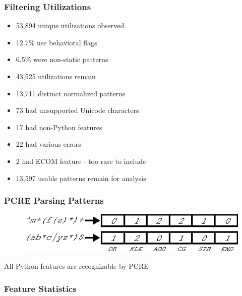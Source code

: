 \begin{frame}
\frametitle{Filtering Utilizations}
\begin{itemize}
\item [] 53,894 unique utilizations observed.
\item [] 12.7\% use behavioral flags
\item [] 6.5\% were non-static patterns
\item [] 43,525 utilizations remain
\item [] 13,711 distinct normalized patterns
\item [] 73 had unsupported Unicode characters
\item [] 17 had non-Python features
\item [] 22 had various errors
\item [] 2 had ECOM feature - too rare to include
\item [] 13,597 usable patterns remain for analysis
\end{itemize}
\end{frame}




\begin{frame}
\frametitle{PCRE Parsing Patterns}
\begin{figure}[h]
  \centering
  \includegraphics[scale=1]{nontex/illustrations/featureParsing.eps}
  \label{fig:usage}
\end{figure}
\begin{center}
\begin{Large}
All Python features are recognizable by PCRE
\end{Large}
\end{center}
\end{frame}


\begin{frame}[fragile]
\frametitle{Feature Statistics}

\end{frame}

